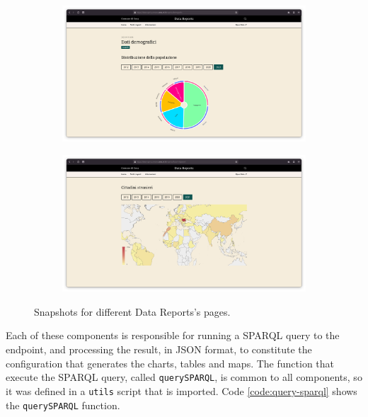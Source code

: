 \begin{figure}[!ht]
  \begin{subfigure}{.5\columnwidth}
    \centering
    \includegraphics[width=\columnwidth]{images/datareports/datareports-demography}
    \label{fig:datareports-demography}
  \end{subfigure}%
  \begin{subfigure}{.5\columnwidth}
    \centering
    \includegraphics[width=\columnwidth]{images/datareports/datareports-citizenship}
    \label{fig:datareports-citizenship}
  \end{subfigure}
  \caption{Snapshots for different Data Reports's pages.}
  \label{fig:datareports-examples}
\end{figure}

Each of these components is responsible for running a \ac{SPARQL} query to the endpoint, and processing the result, in \ac{JSON} format, to constitute the configuration that generates the charts, tables and maps. The function that execute the \ac{SPARQL} query, called \verb#querySPARQL#, is common to all components, so it was defined in a \verb#utils# script that is imported. Code \ref{code:query-sparql} shows the \verb#querySPARQL# function.

